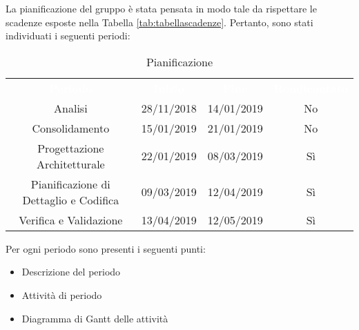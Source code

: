 La pianificazione del gruppo \gruppo \space è stata pensata in modo tale da rispettare le scadenze esposte nella Tabella \ref{tab:tabellascadenze}.\newline
Pertanto, sono stati individuati i seguenti periodi:

\renewcommand{\arraystretch}{1.5}
\begin{table}[H]	
	\begin{center}
	    \begin{tabular}{ c  c  c  c }
	        \rowcolor{greySWEight}
	        \textcolor{white}{\textbf{Periodo}} & \textcolor{white}{\textbf{Inizio}}& \textcolor{white}{\textbf{Fine}}&\textcolor{white}{\textbf{Rendicontato}}\\
	        Analisi & 28/11/2018 & 14/01/2019&No\\
	        Consolidamento & 15/01/2019 & 21/01/2019&No\\
	        Progettazione Architetturale & 22/01/2019 & 08/03/2019&Sì\\
	        Pianificazione di Dettaglio e Codifica & 09/03/2019 & 12/04/2019&Sì\\
	        Verifica e Validazione & 13/04/2019 & 12/05/2019&Sì\\
	    \end{tabular}
	    \caption{Pianificazione} \label{tab:pianificazione} 
	\end{center}
\end{table}


Per ogni periodo sono presenti i seguenti punti:
\begin{itemize}
	\item Descrizione del periodo
	\item Attività di periodo
	\item Diagramma di Gantt delle attività
\end{itemize}